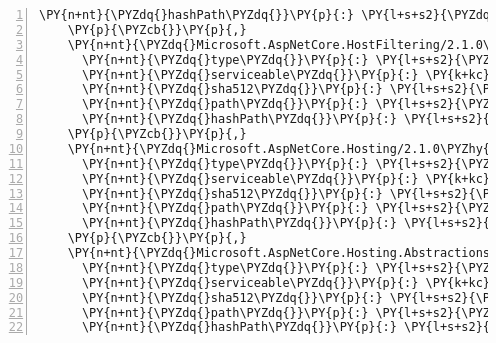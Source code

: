\begin{Verbatim}[commandchars=\\\{\},numbers=left,firstnumber=1,stepnumber=1,numberblanklines=0]
      \PY{n+nt}{\PYZdq{}hashPath\PYZdq{}}\PY{p}{:} \PY{l+s+s2}{\PYZdq{}microsoft.aspnetcore.diagnostics.entityframeworkcore.2.1.0\PYZhy{}rc1\PYZhy{}final.nupkg.sha512\PYZdq{}}
    \PY{p}{\PYZcb{}}\PY{p}{,}
    \PY{n+nt}{\PYZdq{}Microsoft.AspNetCore.HostFiltering/2.1.0\PYZhy{}rc1\PYZhy{}final\PYZdq{}}\PY{p}{:} \PY{p}{\PYZob{}}
      \PY{n+nt}{\PYZdq{}type\PYZdq{}}\PY{p}{:} \PY{l+s+s2}{\PYZdq{}package\PYZdq{}}\PY{p}{,}
      \PY{n+nt}{\PYZdq{}serviceable\PYZdq{}}\PY{p}{:} \PY{k+kc}{true}\PY{p}{,}
      \PY{n+nt}{\PYZdq{}sha512\PYZdq{}}\PY{p}{:} \PY{l+s+s2}{\PYZdq{}sha512\PYZhy{}wRhy3VIHahppBZXJw1HYuPdoTVLolzyFkSeVEQ/dNc3dW86inv+b+S1fBl3KCl1Uv5K/PkmO1bsD0A52qLo1xw==\PYZdq{}}\PY{p}{,}
      \PY{n+nt}{\PYZdq{}path\PYZdq{}}\PY{p}{:} \PY{l+s+s2}{\PYZdq{}microsoft.aspnetcore.hostfiltering/2.1.0\PYZhy{}rc1\PYZhy{}final\PYZdq{}}\PY{p}{,}
      \PY{n+nt}{\PYZdq{}hashPath\PYZdq{}}\PY{p}{:} \PY{l+s+s2}{\PYZdq{}microsoft.aspnetcore.hostfiltering.2.1.0\PYZhy{}rc1\PYZhy{}final.nupkg.sha512\PYZdq{}}
    \PY{p}{\PYZcb{}}\PY{p}{,}
    \PY{n+nt}{\PYZdq{}Microsoft.AspNetCore.Hosting/2.1.0\PYZhy{}rc1\PYZhy{}final\PYZdq{}}\PY{p}{:} \PY{p}{\PYZob{}}
      \PY{n+nt}{\PYZdq{}type\PYZdq{}}\PY{p}{:} \PY{l+s+s2}{\PYZdq{}package\PYZdq{}}\PY{p}{,}
      \PY{n+nt}{\PYZdq{}serviceable\PYZdq{}}\PY{p}{:} \PY{k+kc}{true}\PY{p}{,}
      \PY{n+nt}{\PYZdq{}sha512\PYZdq{}}\PY{p}{:} \PY{l+s+s2}{\PYZdq{}sha512\PYZhy{}5fvlWWZtJbs2EiWuBw19uV5awsxrkMCoUz9qWiayajxydhGu6U93QdVkQSl/zKZMocqEWdIBx0GIAb/ATeQV4g==\PYZdq{}}\PY{p}{,}
      \PY{n+nt}{\PYZdq{}path\PYZdq{}}\PY{p}{:} \PY{l+s+s2}{\PYZdq{}microsoft.aspnetcore.hosting/2.1.0\PYZhy{}rc1\PYZhy{}final\PYZdq{}}\PY{p}{,}
      \PY{n+nt}{\PYZdq{}hashPath\PYZdq{}}\PY{p}{:} \PY{l+s+s2}{\PYZdq{}microsoft.aspnetcore.hosting.2.1.0\PYZhy{}rc1\PYZhy{}final.nupkg.sha512\PYZdq{}}
    \PY{p}{\PYZcb{}}\PY{p}{,}
    \PY{n+nt}{\PYZdq{}Microsoft.AspNetCore.Hosting.Abstractions/2.1.0\PYZhy{}rc1\PYZhy{}final\PYZdq{}}\PY{p}{:} \PY{p}{\PYZob{}}
      \PY{n+nt}{\PYZdq{}type\PYZdq{}}\PY{p}{:} \PY{l+s+s2}{\PYZdq{}package\PYZdq{}}\PY{p}{,}
      \PY{n+nt}{\PYZdq{}serviceable\PYZdq{}}\PY{p}{:} \PY{k+kc}{true}\PY{p}{,}
      \PY{n+nt}{\PYZdq{}sha512\PYZdq{}}\PY{p}{:} \PY{l+s+s2}{\PYZdq{}sha512\PYZhy{}U9sfs2WTRZSkLidlIAkF717rbhQovgTYfbpHOpkm40++Xxdn0ARRa5ktFvmtkj6cqkkqbG1FQsvxwxJMCRRfOw==\PYZdq{}}\PY{p}{,}
      \PY{n+nt}{\PYZdq{}path\PYZdq{}}\PY{p}{:} \PY{l+s+s2}{\PYZdq{}microsoft.aspnetcore.hosting.abstractions/2.1.0\PYZhy{}rc1\PYZhy{}final\PYZdq{}}\PY{p}{,}
      \PY{n+nt}{\PYZdq{}hashPath\PYZdq{}}\PY{p}{:} \PY{l+s+s2}{\PYZdq{}microsoft.aspnetcore.hosting.abstractions.2.1.0\PYZhy{}rc1\PYZhy{}final.nupkg.sha512\PYZdq{}}

\end{Verbatim}
